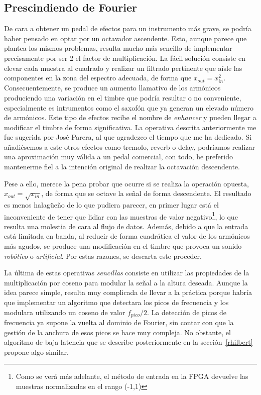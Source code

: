 \subsection{Prescindiendo de Fourier}
\label{nofourier}
De cara a obtener un pedal de efectos para un instrumento más grave, se podría haber pensado en optar por un octavador ascendente. Esto, aunque parece que plantea los mismos problemas, resulta mucho más sencillo de implementar precisamente por ser 2 el factor de multiplicación. La fácil solución consiste en elevar cada muestra al cuadrado y realizar un filtrado pertinente que aísle las componentes en la zona del espectro adecuada, de forma que $x_{out} = x_{in}^{2}$. Consecuentemente, se produce un aumento llamativo de los armónicos produciendo una variación en el timbre que podría resultar o no conveniente, especialmente es intrumentos como el saxofón que ya generan un elevado número de armónicos. Este tipo de efectos recibe el nombre de \emph{enhancer} y pueden llegar a modificar el timbre de forma significativa. La operativa descrita anteriormente me fue sugerida por José Parera, al que agradezco el tiempo que me ha dedicado. Si añadiésemos a este otros efectos como tremolo, reverb o delay, podríamos realizar una aproximación muy válida a un pedal comercial, con todo, he preferido mantenerme fiel a la intención original de realizar la octavación descendente.

Pese a ello, merece la pena probar que ocurre si se realiza la operación opuesta, $x_{out} = \sqrt{x_{in}}$, de forma que se octave la señal de forma descendente. El resultado es menos halagüeño de lo que pudiera parecer, en primer lugar está el inconveniente de tener que lidiar con las muestras de valor negativo\footnote{Como se verá más adelante, el método de entrada en la FPGA devuelve las muestras normalizadas en el rango (-1,1)}, lo que resulta una molestia de cara al flujo de datos. Además, debido a que la entrada está limitada en banda, al reducir de forma cuadrática el valor de los armónicos más agudos, se produce una modificación en el timbre que provoca un sonido \emph{robótico} o \emph{artificial}. Por estas razones, se descarta este proceder.

La última de estas operativas \emph{sencillas} consiste en utilizar las propiedades de la multiplicación por coseno para modular la señal a la altura deseada. Aunque la idea parece simple, resulta muy complicada de llevar a la práctica porque habría que implementar un algoritmo que detectara los picos de frecuencia y los modulara utilizando un coseno de valor $f_{pico}/2$. La detección de picos de frecuencia ya supone la vuelta al dominio de Fourier, sin contar con que la gestión de la anchura de esos picos se hace muy compleja. No obstante, el algoritmo de baja latencia que se describe posteriormente en la sección~\ref{rhilbert} propone algo similar.

